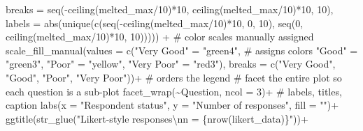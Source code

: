 \documentclass[
]{article}
\newenvironment{Shaded}{\begin{snugshade}}{\end{snugshade}}
\newcommand{\CharTok}[1]{\textcolor[rgb]{0.86,0.64,0.64}{#1}}
\newcommand{\CommentTok}[1]{\textcolor[rgb]{0.50,0.62,0.50}{#1}}
\newcommand{\DataTypeTok}[1]{\textcolor[rgb]{0.87,0.87,0.75}{#1}}
\newcommand{\DecValTok}[1]{\textcolor[rgb]{0.86,0.86,0.80}{#1}}
\newcommand{\KeywordTok}[1]{\textcolor[rgb]{0.94,0.87,0.69}{#1}}
\newcommand{\NormalTok}[1]{\textcolor[rgb]{0.80,0.80,0.80}{#1}}
\newcommand{\OperatorTok}[1]{\textcolor[rgb]{0.94,0.94,0.82}{#1}}
\newcommand{\StringTok}[1]{\textcolor[rgb]{0.80,0.58,0.58}{#1}}
\begin{document}
\begin{Shaded}
\begin{Highlighting}[]
                       \DataTypeTok{breaks =} \KeywordTok{seq}\NormalTok{(}\OperatorTok{{-}}\KeywordTok{ceiling}\NormalTok{(melted\_max}\OperatorTok{/}\DecValTok{10}\NormalTok{)}\OperatorTok{*}\DecValTok{10}\NormalTok{, }\KeywordTok{ceiling}\NormalTok{(melted\_max}\OperatorTok{/}\DecValTok{10}\NormalTok{)}\OperatorTok{*}\DecValTok{10}\NormalTok{, }\DecValTok{10}\NormalTok{),}
                       \DataTypeTok{labels =} \KeywordTok{abs}\NormalTok{(}\KeywordTok{unique}\NormalTok{(}\KeywordTok{c}\NormalTok{(}\KeywordTok{seq}\NormalTok{(}\OperatorTok{{-}}\KeywordTok{ceiling}\NormalTok{(melted\_max}\OperatorTok{/}\DecValTok{10}\NormalTok{)}\OperatorTok{*}\DecValTok{10}\NormalTok{, }\DecValTok{0}\NormalTok{, }\DecValTok{10}\NormalTok{),}
                                            \KeywordTok{seq}\NormalTok{(}\DecValTok{0}\NormalTok{, }\KeywordTok{ceiling}\NormalTok{(melted\_max}\OperatorTok{/}\DecValTok{10}\NormalTok{)}\OperatorTok{*}\DecValTok{10}\NormalTok{, }\DecValTok{10}\NormalTok{))))) }\OperatorTok{+}
\StringTok{     }
\StringTok{    }\CommentTok{\# color scales manually assigned }
\StringTok{    }\KeywordTok{scale\_fill\_manual}\NormalTok{(}\DataTypeTok{values =} \KeywordTok{c}\NormalTok{(}\StringTok{"Very Good"}\NormalTok{  =}\StringTok{ "green4"}\NormalTok{, }\CommentTok{\# assigns colors}
                                  \StringTok{"Good"}\NormalTok{      =}\StringTok{ "green3"}\NormalTok{,}
                                  \StringTok{"Poor"}\NormalTok{      =}\StringTok{ "yellow"}\NormalTok{,}
                                  \StringTok{"Very Poor"}\NormalTok{ =}\StringTok{ "red3"}\NormalTok{),}
                       \DataTypeTok{breaks =} \KeywordTok{c}\NormalTok{(}\StringTok{"Very Good"}\NormalTok{, }\StringTok{"Good"}\NormalTok{, }\StringTok{"Poor"}\NormalTok{, }\StringTok{"Very Poor"}\NormalTok{))}\OperatorTok{+}\StringTok{ }\CommentTok{\# orders the legend}
\StringTok{     }
\StringTok{    }
\StringTok{     }
\StringTok{    }\CommentTok{\# facet the entire plot so each question is a sub{-}plot}
\StringTok{    }\KeywordTok{facet\_wrap}\NormalTok{(}\OperatorTok{\textasciitilde{}}\NormalTok{Question, }\DataTypeTok{ncol =} \DecValTok{3}\NormalTok{)}\OperatorTok{+}
\StringTok{     }
\StringTok{    }\CommentTok{\# labels, titles, caption}
\StringTok{    }\KeywordTok{labs}\NormalTok{(}\DataTypeTok{x =} \StringTok{"Respondent status"}\NormalTok{,}
          \DataTypeTok{y =} \StringTok{"Number of responses"}\NormalTok{,}
          \DataTypeTok{fill =} \StringTok{""}\NormalTok{)}\OperatorTok{+}
\StringTok{     }\KeywordTok{ggtitle}\NormalTok{(}\KeywordTok{str\_glue}\NormalTok{(}\StringTok{"Likert{-}style responses}\CharTok{\textbackslash{}n}\StringTok{n = \{nrow(likert\_data)\}"}\NormalTok{))}\OperatorTok{+}


\end{Highlighting}
\end{Shaded}
\end{document}
